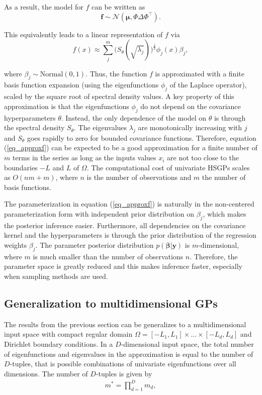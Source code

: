 \documentclass[onecolumn,a4paper,11pt]{article}
\begin{document}
\noindent As a result, the model for $f$ can be written as
%
\begin{equation}
\bm{f} \sim \mathcal{N}(\bm{\mu},\Phi \Delta \Phi^\intercal). \nonumber
\end{equation}

\noindent This equivalently leads to a linear representation of $f$ via
%
\begin{equation}\label{eq_approxf}
f(x) \approx \sum_{j}^m \big( S_{\theta}(\sqrt{\lambda_j})\big)^{\! \frac{1}{2}} \phi_j(x) \beta_j,
\end{equation}

\noindent where $\beta_j \sim \text{Normal}(0,1)$. Thus, the function $f$ is approximated with a finite basis function expansion (using the eigenfunctions $\phi_j$ of the Laplace operator), scaled by the square root of spectral density values. A key property of this approximation is that the eigenfunctions $\phi_j$ do not depend on the covariance hyperparameters $\theta$. Instead, the only dependence of the model on $\theta$ is through the spectral density $S_{\theta}$. The eigenvalues $\lambda_j$ are monotonically increasing with $j$ and $S_{\theta}$ goes rapidly to zero for bounded covariance functions. Therefore, equation (\ref{eq_approxf}) can be expected to be a good approximation for a finite number of $m$ terms in the series as long as the inputs values $x_i$ are not too close to the boundaries $-L$ and $L$ of $\Omega$. The computational cost of univariate HSGPs scales as $O(nm + m)$, where $n$ is the number of observations and $m$ the number of basis functions.

The parameterization in equation (\ref{eq_approxf}) is naturally in the non-centered parameterization form with independent prior distribution on $\beta_j$, which makes the posterior inference easier. Furthermore, all dependencies on the covariance kernel and the hyperparameters is through the prior distribution of the regression weights $\beta_j$. The parameter posterior distribution $p(\bm{\beta}|\bm{y})$ is $m$-dimensional, where $m$ is much smaller than the number of observations $n$. Therefore, the parameter space is greatly reduced and this makes inference faster, especially when sampling methods are used.

\subsection{Generalization to multidimensional GPs} \label{ch5_sec_method_multi}

The results from the previous section can be generalizes to a multidimensional input space with compact regular domain $\Omega=[-L_1,L_1] \times \dots \times [-L_d,L_d]$ and Dirichlet boundary conditions. 
In a $D$-dimensional input space, the total number of eigenfunctions and eigenvalues in the approximation is equal to the number of $D$-tuples, that is possible combinations of univariate eigenfunctions over all dimensions. The number of $D$-tuples is given by 
%
\begin{align} \label{eq_m_multi}
m^{\ast} = \prod_{d=1}^{D} m_d,
\end{align}
\end{document}
